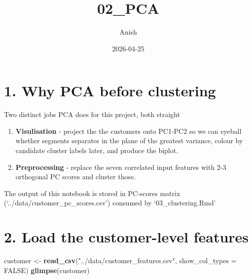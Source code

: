 \documentclass[
]{article}
\title{02\_PCA}
\author{Anish}
\date{2026-04-25}
\newenvironment{Shaded}{\begin{snugshade}}{\end{snugshade}}
\newcommand{\AttributeTok}[1]{\textcolor[rgb]{0.13,0.29,0.53}{#1}}
\newcommand{\ConstantTok}[1]{\textcolor[rgb]{0.56,0.35,0.01}{#1}}
\newcommand{\FunctionTok}[1]{\textcolor[rgb]{0.13,0.29,0.53}{\textbf{#1}}}
\newcommand{\NormalTok}[1]{#1}
\newcommand{\OtherTok}[1]{\textcolor[rgb]{0.56,0.35,0.01}{#1}}
\newcommand{\StringTok}[1]{\textcolor[rgb]{0.31,0.60,0.02}{#1}}
\providecommand{\tightlist}{%
  \setlength{\itemsep}{0pt}\setlength{\parskip}{0pt}}
\begin{document}
\maketitle

\section{1. Why PCA before clustering}\label{why-pca-before-clustering}

Two distinct jobs PCA does for this project, both straight

\begin{enumerate}
\def\labelenumi{\arabic{enumi}.}
\tightlist
\item
  \textbf{Visulisation} - project the the customers onto PC1-PC2 so we
  can eyeball whether segments separates in the plane of the greatest
  variance, colour by candidate cluster labels later, and produce the
  biplot.
\item
  \textbf{Preprocessing} - replace the seven correlated input features
  with 2-3 orthogonal PC scores and cluster those.
\end{enumerate}

The output of this notebook is stored in PC-scores matrix
(`../data/customer\_pc\_scores.csv') consumed by `03\_clustering.Rmd'

\section{2. Load the customer-level
features}\label{load-the-customer-level-features}

\begin{Shaded}
\begin{Highlighting}[]
\NormalTok{customer }\OtherTok{\textless{}{-}} \FunctionTok{read\_csv}\NormalTok{(}\StringTok{"../data/customer\_features.csv"}\NormalTok{,}
                     \AttributeTok{show\_col\_types =} \ConstantTok{FALSE}\NormalTok{)}
\FunctionTok{glimpse}\NormalTok{(customer)}
\end{Highlighting}
\end{Shaded}
\end{document}
